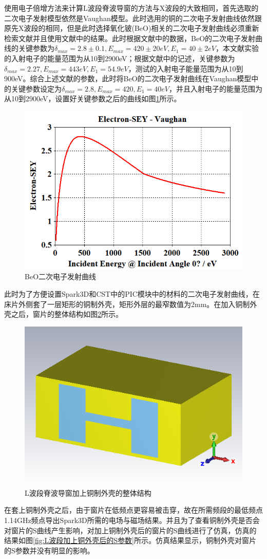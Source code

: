 \documentclass[master]{thesis-uestc}
\begin{document}
使用电子倍增方法来计算L波段脊波导窗的方法与X波段的大致相同，首先选取的二次电子发射模型依然是Vaughan模型。此时选用的铜的二次电子发射曲线依然跟原先X波段的相同，但是此时选择氧化铍(BeO)相关的二次电子发射曲线必须重新检索文献并且使用文献中的结果。此时根据文献\cite{shih_1994_beosee}中的数据，BeO的二次电子发射曲线的关键参数为$\delta_{max}=2.8 \pm 0.1, E_{max}=420 \pm 20 eV, E_1 = 40 \pm 2 eV$，本文献实验的入射电子的能量范围为从10到2900eV；根据文献\cite{ritz_1988_secondary}中的记述，关键参数为$\delta_{max}=2.27, E_{max}= 443  eV, E_1 =54.9 eV$，测试的入射电子能量范围为从10到900eV。综合上述文献的参数，此时将BeO的二次电子发射曲线在Vaughan模型中的关键参数设定为$\delta_{max}=2.8 , E_{max}=420 , E_1 = 40 eV$，并且入射电子的能量范围为从10到2900eV，设置好关键参数之后的曲线如图\ref{fig:BeO二次电子发射曲线}所示。
\begin{figure}[!htb]
    \centering
    \includegraphics[width=0.5\linewidth]{pic/chapter4/BeO二次电子发射曲线.png}
    \caption{BeO二次电子发射曲线}
    \label{fig:BeO二次电子发射曲线}
\end{figure}

此时为了方便设置Spark3D和CST中的PIC模块中的材料的二次电子发射曲线，在床片外侧套了一层矩形的铜制外壳，矩形外层的最窄数值为2mm。在加入铜制外壳之后，窗片的整体结构如图\ref{fig:L波段加上铜制外壳}所示。

\begin{figure}[!htb]
    \centering
    \includegraphics[width=0.3\linewidth]{pic/chapter4/L波段加上铜制外壳.png}
    \caption{L波段脊波导窗加上铜制外壳的整体结构}
    \label{fig:L波段加上铜制外壳}
\end{figure}

在套上铜制外壳之后，由于窗片在低频点更容易被击穿，故在所需频段的最低频点1.14GHz频点导出Spark3D所需的电场与磁场结果。并且为了查看铜制外壳是否会对窗片的S曲线产生影响，对加上铜制外壳后的窗片的S曲线进行了仿真，仿真的结果如图\ref{fig:L波段加上铜外壳后的S参数}所示。仿真结果显示，铜制外壳对窗片的S参数并没有明显的影响。
\end{document}
